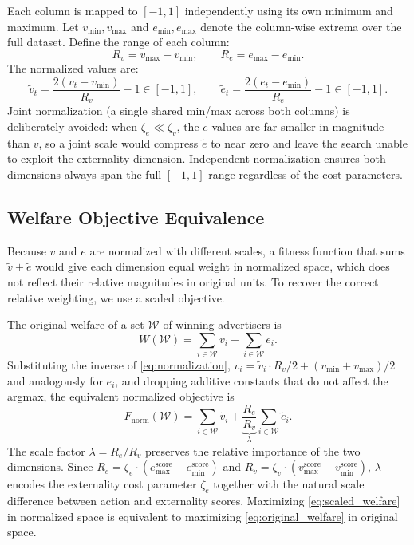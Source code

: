 \documentclass[11pt]{article}
\newcommand{\tv}{\tilde{v}}
\newcommand{\te}{\tilde{e}}
\begin{document}
Each column is mapped to $[-1, 1]$ independently using its own minimum and maximum.
Let $v_{\min}, v_{\max}$ and $e_{\min}, e_{\max}$ denote the column-wise extrema
over the full dataset. Define the range of each column:
\begin{equation}
    R_v = v_{\max} - v_{\min}, \qquad R_e = e_{\max} - e_{\min}.
\end{equation}
The normalized values are:
\begin{equation}
    \tv_t = \frac{2(v_t - v_{\min})}{R_v} - 1 \in [-1,1], \qquad
    \te_t = \frac{2(e_t - e_{\min})}{R_e} - 1 \in [-1,1].
    \label{eq:normalization}
\end{equation}
Joint normalization (a single shared min/max across both columns) is
deliberately avoided: when $\zeta_e \ll \zeta_v$, the $e$ values are far
smaller in magnitude than $v$, so a joint scale would compress $\te$ to
near zero and leave the search unable to exploit the externality dimension.
Independent normalization ensures both dimensions always span the full $[-1,1]$
range regardless of the cost parameters.

\subsection{Welfare Objective Equivalence}

Because $v$ and $e$ are normalized with different scales, a fitness function
that sums $\tv + \te$ would give each dimension equal weight in normalized
space, which does not reflect their relative magnitudes in original units.
To recover the correct relative weighting, we use a scaled objective.

The original welfare of a set $\mathcal{W}$ of winning advertisers is
\begin{equation}
    W(\mathcal{W}) = \sum_{i \in \mathcal{W}} v_i + \sum_{i \in \mathcal{W}} e_i.
    \label{eq:original_welfare}
\end{equation}
Substituting the inverse of \eqref{eq:normalization},
$v_i = \tv_i \cdot R_v/2 + (v_{\min}+v_{\max})/2$
and analogously for $e_i$, and dropping additive constants
that do not affect the argmax, the equivalent normalized objective is
\begin{equation}
    F_{\text{norm}}(\mathcal{W})
    = \sum_{i \in \mathcal{W}} \tv_i
    + \underbrace{\frac{R_e}{R_v}}_{\lambda} \sum_{i \in \mathcal{W}} \te_i.
    \label{eq:scaled_welfare}
\end{equation}
The scale factor $\lambda = R_e/R_v$ preserves the relative importance of
the two dimensions. Since $R_e = \zeta_e \cdot (e_{\max}^{\text{score}} - e_{\min}^{\text{score}})$
and $R_v = \zeta_v \cdot (v_{\max}^{\text{score}} - v_{\min}^{\text{score}})$,
$\lambda$ encodes the externality cost parameter $\zeta_e$ together with
the natural scale difference between action and externality scores.
Maximizing \eqref{eq:scaled_welfare} in normalized space is equivalent to
maximizing \eqref{eq:original_welfare} in original space.
\end{document}
